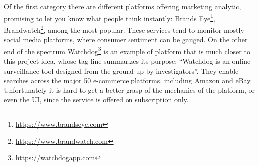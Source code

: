 Of the first category there are different platforms offering marketing
analytic, promising to let you know what people think instantly: Brands
Eye\texttrademark\footnote{\url{https://www.brandseye.com}},
Brandwatch\texttrademark\footnote{\url{https://www.brandwatch.com}}, among the
most popular. These services tend to monitor mostly social media platforms,
where consumer sentiment can be gauged. On the other end of the spectrum
Watchdog\texttrademark\footnote{\url{https://watchdogapp.com}} is an example
of platform that is much closer to this project idea, whose tag line summarizes
its purpose: ``Watchdog is an online surveillance tool
designed from the ground up by investigators''\cite{wtchd}. They enable searches
across the major 50 e-commerce platforms, including Amazon and eBay.
Unfortunately it is hard to get a better grasp of the mechanics of the platform,
or even the UI, since the service is offered on subscription only.

